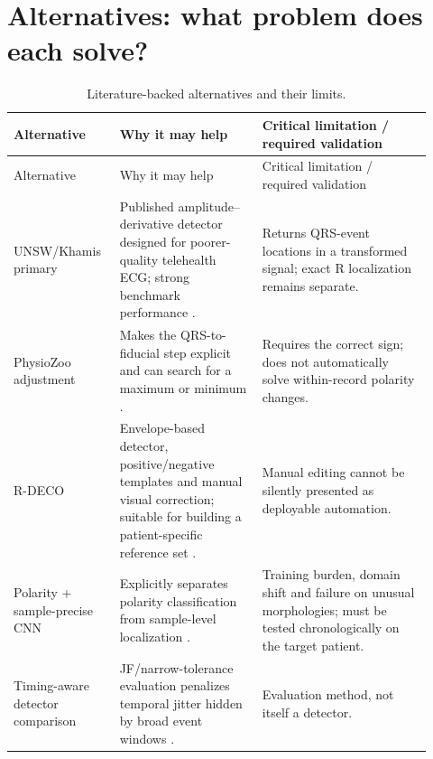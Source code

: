 \documentclass[11pt]{article}
\begin{document}
\section{Alternatives: what problem does each solve?}
\begin{longtable}{@{}p{0.22\linewidth}p{0.32\linewidth}p{0.38\linewidth}@{}}
\caption{Literature-backed alternatives and their limits.}\\
\toprule
Alternative & Why it may help & Critical limitation / required validation \\
\midrule
\endfirsthead
\toprule
Alternative & Why it may help & Critical limitation / required validation \\
\midrule
\endhead
UNSW/Khamis primary & Published amplitude--derivative detector designed for poorer-quality telehealth ECG; strong benchmark performance \cite{khamis2016telehealth,kristof2024qrs}. & Returns QRS-event locations in a transformed signal; exact R localization remains separate. \\
PhysioZoo adjustment & Makes the QRS-to-fiducial step explicit and can search for a maximum or minimum \cite{behar2018physiozoo,physiozooqrsadjust}. & Requires the correct sign; does not automatically solve within-record polarity changes. \\
R-DECO & Envelope-based detector, positive/negative templates and manual visual correction; suitable for building a patient-specific reference set \cite{rdeco2021}. & Manual editing cannot be silently presented as deployable automation. \\
Polarity + sample-precise CNN & Explicitly separates polarity classification from sample-level localization \cite{oudkerkpool2021rpeak}. & Training burden, domain shift and failure on unusual morphologies; must be tested chronologically on the target patient. \\
Timing-aware detector comparison & JF/narrow-tolerance evaluation penalizes temporal jitter hidden by broad event windows \cite{porr2024jitter,reklewski2026noise}. & Evaluation method, not itself a detector. \\
\bottomrule
\end{longtable}
\end{document}
